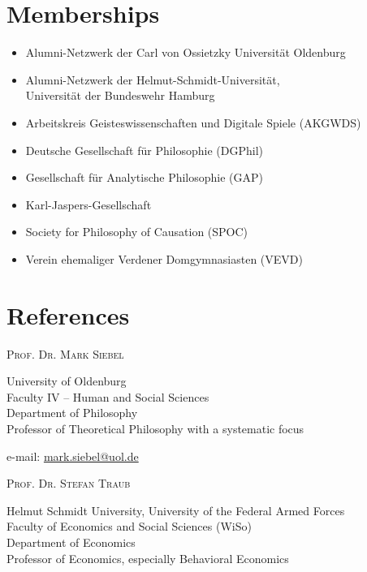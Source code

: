 \documentclass[a4paper,10pt]{article}
\begin{document}
\section{Memberships}
\begin{itemize}
   \item Alumni-Netzwerk der Carl von Ossietzky Universität Oldenburg
   \item Alumni-Netzwerk der Helmut-Schmidt-Universität,\\Universität der Bundeswehr Hamburg
   \item Arbeitskreis Geisteswissenschaften und Digitale Spiele (AKGWDS)
   \item Deutsche Gesellschaft für Philosophie (DGPhil)
   \item Gesellschaft für Analytische Philosophie (GAP)
   \item Karl-Jaspers-Gesellschaft
   \item Society for Philosophy of Causation (SPOC)
   \item Verein ehemaliger Verdener Domgymnasiasten (VEVD)
\end{itemize}


\clearpage
\section{References}
\textsc{Prof\hspace{0.5pt}. Dr\hspace{0.5pt}. Mark Siebel}

University of Oldenburg\\
Faculty IV -- Human and Social Sciences\\
Department of Philosophy\\
Professor of Theoretical Philosophy with a systematic focus

e-mail: \href{mailto:mark.siebel@uol.de}{mark.siebel@uol.de}\vspace{12pt}

\textsc{Prof\hspace{0.5pt}. Dr\hspace{0.5pt}. Stefan Traub}

Helmut Schmidt University, University of the Federal Armed Forces\\
Faculty of Economics and Social Sciences (WiSo)\\
Department of Economics\\
Professor of Economics, especially Behavioral Economics
\end{document}
